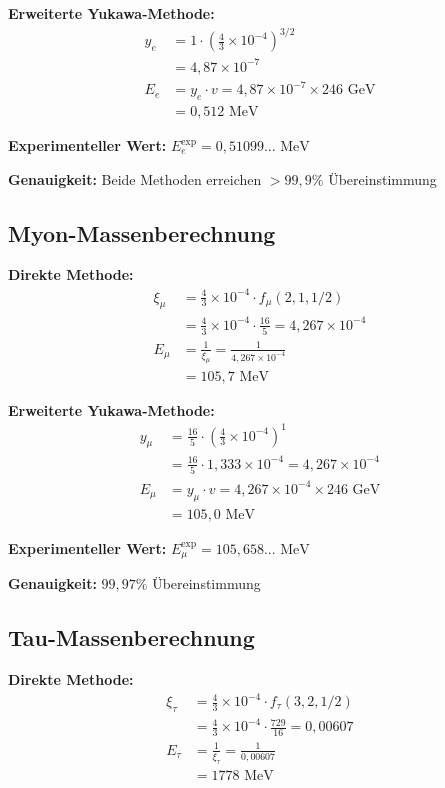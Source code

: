 \documentclass[12pt,a4paper]{report}
\begin{document}
\textbf{Erweiterte Yukawa-Methode:}
\begin{align}
	y_e &= 1 \cdot \left(\frac{4}{3} \times 10^{-4}\right)^{3/2} \\
	&= 4,87 \times 10^{-7} \\
	E_e &= y_e \cdot v = 4,87 \times 10^{-7} \times 246 \text{ GeV} \\
	&= 0,512 \text{ MeV}
\end{align}

\textbf{Experimenteller Wert:} $E_e^{\text{exp}} = 0,51099... \text{ MeV}$

\textbf{Genauigkeit:} Beide Methoden erreichen $> 99,9\%$ Übereinstimmung

\subsection{Myon-Massenberechnung}
\label{subsec:muon_calculation}

\textbf{Direkte Methode:}
\begin{align}
	\xi_\mu &= \frac{4}{3} \times 10^{-4} \cdot f_\mu(2,1,1/2) \\
	&= \frac{4}{3} \times 10^{-4} \cdot \frac{16}{5} = 4,267 \times 10^{-4} \\
	E_{\mu} &= \frac{1}{\xi_\mu} = \frac{1}{4,267 \times 10^{-4}} \\
	&= 105,7 \text{ MeV}
\end{align}

\textbf{Erweiterte Yukawa-Methode:}
\begin{align}
	y_\mu &= \frac{16}{5} \cdot \left(\frac{4}{3} \times 10^{-4}\right)^1 \\
	&= \frac{16}{5} \cdot 1,333 \times 10^{-4} = 4,267 \times 10^{-4} \\
	E_\mu &= y_\mu \cdot v = 4,267 \times 10^{-4} \times 246 \text{ GeV} \\
	&= 105,0 \text{ MeV}
\end{align}

\textbf{Experimenteller Wert:} $E_\mu^{\text{exp}} = 105,658... \text{ MeV}$

\textbf{Genauigkeit:} $99,97\%$ Übereinstimmung

\subsection{Tau-Massenberechnung}
\label{subsec:tau_calculation}

\textbf{Direkte Methode:}
\begin{align}
	\xi_\tau &= \frac{4}{3} \times 10^{-4} \cdot f_\tau(3,2,1/2) \\
	&= \frac{4}{3} \times 10^{-4} \cdot \frac{729}{16} = 0,00607 \\
	E_{\tau} &= \frac{1}{\xi_\tau} = \frac{1}{0,00607} \\
	&= 1778 \text{ MeV}
\end{align}
\end{document}
